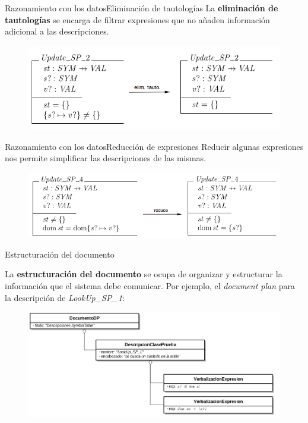 \documentclass[pdf]{beamer}
\begin{document}
\begin{frame}{Razonamiento con los datos}{Eliminación de tautologías}
  La \textbf{eliminación de tautologías} se encarga de filtrar expresiones que no añaden información adicional a las descripciones.
  \begin{figure}[H]
    \centering
    \includegraphics[scale=0.4]{img/ej_elim_tauto.png}
  \end{figure}
\end{frame}
                                
\begin{frame}{Razonamiento con los datos}{Reducción de expresiones}
  Reducir algunas expresiones nos permite simplificar las descripciones de las mismas.
  \begin{figure}[H]
    \centering
    \includegraphics[scale=0.4]{img/ej_reduce.png}
  \end{figure}
\end{frame}
                                
\begin{frame}{Estructuración del documento}{}

  La \textbf{estructuración del documento} se ocupa de organizar y estructurar la información que el sistema debe comunicar. Por ejemplo, el \textit{document plan} para la descripción de \textit{LookUp\_SP\_1}:
  
  \begin{figure}[H]
    \centering
    \includegraphics[scale=0.3]{img/document_plan_ej.png}
  \end{figure}
\end{frame}
                                
\end{document}
